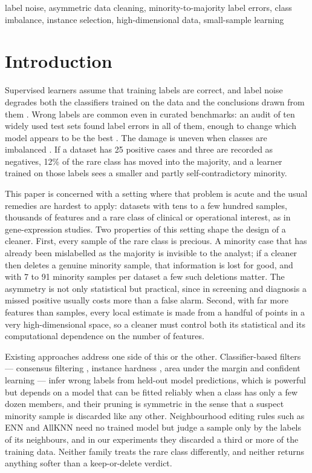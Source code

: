 \documentclass[conference]{IEEEtran}
\begin{document}
\begin{IEEEkeywords}
label noise, asymmetric data cleaning, minority-to-majority label errors, class imbalance, instance selection, high-dimensional data, small-sample learning
\end{IEEEkeywords}

\section{Introduction}\label{sec:introduction}

Supervised learners assume that training labels are correct, and label noise degrades both the classifiers trained on the data and the conclusions drawn from them \cite{frenay2014,song2023}. Wrong labels are common even in curated benchmarks: an audit of ten widely used test sets found label errors in all of them, enough to change which model appears to be the best \cite{northcutt2021pervasive}. The damage is uneven when classes are imbalanced \cite{he2009,johnson2019}. If a dataset has 25 positive cases and three are recorded as negatives, 12\% of the rare class has moved into the majority, and a learner trained on those labels sees a smaller and partly self-contradictory minority.

This paper is concerned with a setting where that problem is acute and the usual remedies are hardest to apply: datasets with tens to a few hundred samples, thousands of features and a rare class of clinical or operational interest, as in gene-expression studies. Two properties of this setting shape the design of a cleaner. First, every sample of the rare class is precious. A minority case that has already been mislabelled as the majority is invisible to the analyst; if a cleaner then deletes a genuine minority sample, that information is lost for good, and with 7 to 91 minority samples per dataset a few such deletions matter. The asymmetry is not only statistical but practical, since in screening and diagnosis a missed positive usually costs more than a false alarm. Second, with far more features than samples, every local estimate is made from a handful of points in a very high-dimensional space, so a cleaner must control both its statistical and its computational dependence on the number of features.

Existing approaches address one side of this or the other. Classifier-based filters --- consensus filtering \cite{brodley1999}, instance hardness \cite{smith2014}, area under the margin \cite{pleiss2020} and confident learning \cite{northcutt2021confident} --- infer wrong labels from held-out model predictions, which is powerful but depends on a model that can be fitted reliably when a class has only a few dozen members, and their pruning is symmetric in the sense that a suspect minority sample is discarded like any other. Neighbourhood editing rules such as ENN and AllKNN \cite{wilson1972,tomek1976} need no trained model but judge a sample only by the labels of its neighbours, and in our experiments they discarded a third or more of the training data. Neither family treats the rare class differently, and neither returns anything softer than a keep-or-delete verdict.
\end{document}
